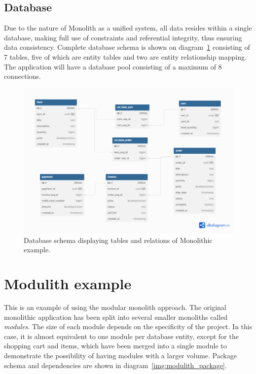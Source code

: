\subsection{Database}
Due to the nature of Monolith as a unified system, all data resides within a single database, making full use of constraints and referential integrity, thus ensuring data consistency. Complete database schema is shown on diagram~\ref{img:monolith_db_schema} consisting of 7 tables, five of which are entity tables and two are entity relationship mapping. The application will have a database pool consisting of a maximum of 8 connections.

\begin{figure}
    \centering
    \includegraphics[width=\textwidth]{images/monolith_db_schema.png}
    \caption{Database schema displaying tables and relations of Monolithic example. \label{img:monolith_db_schema}}
\end{figure}



\section{Modulith example}
This is an example of using the modular monolith approach. The original monolithic application has been split into several smaller monoliths called \textit{modules}. The size of each module depends on the specificity of the project. In this case, it is almost equivalent to one module per database entity, except for the shopping cart and items, which have been merged into a single module to demonstrate the possibility of having modules with a larger volume. Package schema and dependencies are shown in diagram~\ref{img:modulith_package}.

